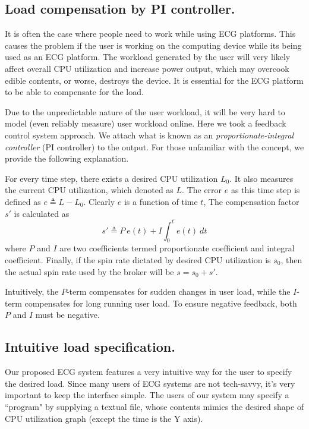 \documentclass[conference]{IEEEtran}
\begin{document}
\subsection{Load compensation by PI controller.}
It is often the case where people need to work while using ECG platforms. This causes the
problem if the user is working on the computing device while its being used as an ECG platform.
The workload generated by the user will very likely affect overall CPU utilization and increase
power output, which may overcook edible contents, or worse, destroys the device. It is essential
for the ECG platform to be able to compensate for the load. 

Due to the unpredictable nature of the user workload, it will be very hard to model (even reliably measure) 
user workload online. Here we took a feedback control system approach. We attach what is known as an 
\textit{proportionate-integral controller} (PI controller) to the output. For those unfamiliar with the 
concept, we provide the following explanation. 

For every time step, there exists a desired CPU utilization $L_0$. It also measures the current CPU utilization, 
which denoted as $L$. The error $e$ as this time step is defined as $e \triangleq L - L_0$. Clearly $e$ is a function
of time $t$, The compensation factor $s'$ is calculated as
$$ s' \triangleq P~e(t) + I\int_{0}^{t}e(t)~dt$$
where $P$ and $I$ are two coefficients termed proportionate coefficient and integral coefficient. Finally, if the spin
rate dictated by desired CPU utilization is $s_0$, then the actual spin rate used by the broker will be $s = s_0 + s'$.

Intuitively, the $P$-term compensates for sudden changes in user load, while the
$I$-term compensates for long running user load. To ensure negative feedback, both $P$ and $I$ must be negative.

\subsection{Intuitive load specification.}

Our proposed ECG system features a very intuitive way for the user to specify the desired load. 
Since many users of ECG systems are not tech-savvy, it's very important to keep the interface simple. 
The users of our system may specify a ``program" by supplying a textual file, whose contents mimics the
desired shape of CPU utilization graph (except the time is the Y axis). 
\end{document}
